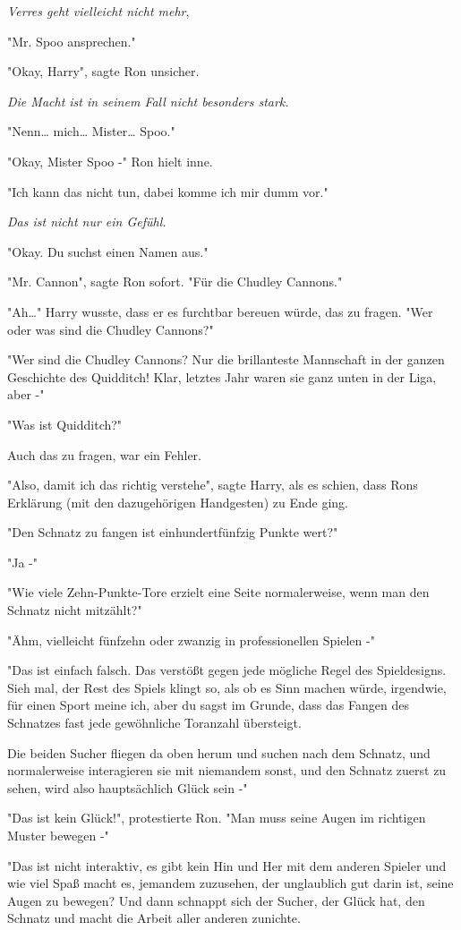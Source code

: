 {\emph{Verres geht vielleicht nicht mehr},

"Mr. Spoo ansprechen."

"Okay, Harry", sagte Ron unsicher.

\emph{Die Macht ist in seinem Fall nicht besonders stark.}

"Nenn… mich… Mister… Spoo."

"Okay, Mister Spoo -" Ron hielt inne.

"Ich kann das nicht tun, dabei komme ich mir dumm vor."

\emph{Das ist nicht nur ein Gefühl.}

"Okay. Du suchst einen Namen aus."

"Mr. Cannon", sagte Ron sofort. "Für die Chudley Cannons."

"Ah…" Harry wusste, dass er es furchtbar bereuen würde, das zu fragen. "Wer oder was sind die Chudley Cannons?"

"Wer sind die Chudley Cannons? Nur die brillanteste Mannschaft in der ganzen Geschichte des Quidditch! Klar, letztes Jahr waren sie ganz unten in der Liga, aber -"

"Was ist Quidditch?"

Auch das zu fragen, war ein Fehler.

"Also, damit ich das richtig verstehe", sagte Harry, als es schien, dass Rons Erklärung (mit den dazugehörigen Handgesten) zu Ende ging.

"Den Schnatz zu fangen ist einhundertfünfzig Punkte wert?"

"Ja -"

"Wie viele Zehn-Punkte-Tore erzielt eine Seite normalerweise, wenn man den Schnatz nicht mitzählt?"

"Ähm, vielleicht fünfzehn oder zwanzig in professionellen Spielen -"

"Das ist einfach falsch. Das verstößt gegen jede mögliche Regel des Spieldesigns. Sieh mal, der Rest des Spiels klingt so, als ob es Sinn machen würde, irgendwie, für einen Sport meine ich, aber du sagst im Grunde, dass das Fangen des Schnatzes fast jede gewöhnliche Toranzahl übersteigt.

Die beiden Sucher fliegen da oben herum und suchen nach dem Schnatz, und normalerweise interagieren sie mit niemandem sonst, und den Schnatz zuerst zu sehen, wird also hauptsächlich Glück sein -"

"Das ist kein Glück!", protestierte Ron. "Man muss seine Augen im richtigen Muster bewegen -"

"Das ist nicht interaktiv, es gibt kein Hin und Her mit dem anderen Spieler und wie viel Spaß macht es, jemandem zuzusehen, der unglaublich gut darin ist, seine Augen zu bewegen? Und dann schnappt sich der Sucher, der Glück hat, den Schnatz und macht die Arbeit aller anderen zunichte.

}

